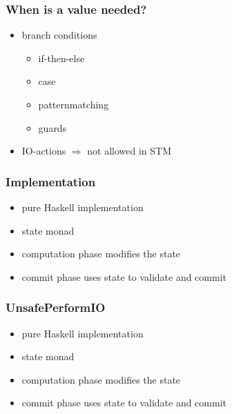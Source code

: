 \documentclass{beamer}
\begin{document}
  \begin{frame}
   \frametitle{When is a value needed?}
   \begin{itemize}\setlength\itemsep{1em}
    \item branch conditions
       \begin{itemize}
        \item if-then-else
        \item case
        \item patternmatching
        \item guards
       \end{itemize}
    \item IO-actions $\Rightarrow$ not allowed in STM
   \end{itemize}
  \end{frame}

  \begin{frame}
  \frametitle{Implementation}
  \begin{itemize}\setlength\itemsep{1em}
   \item pure Haskell implementation
   \item state monad
   \item computation phase modifies the state 
   \item commit phase uses state to validate and commit
  \end{itemize}
  \end{frame}
  
  \begin{frame}
  \frametitle{UnsafePerformIO}
  \begin{itemize}\setlength\itemsep{1em}
   \item pure Haskell implementation
   \item state monad
   \item computation phase modifies the state 
   \item commit phase uses state to validate and commit
  \end{itemize}
  \end{frame}
  

\end{document}
